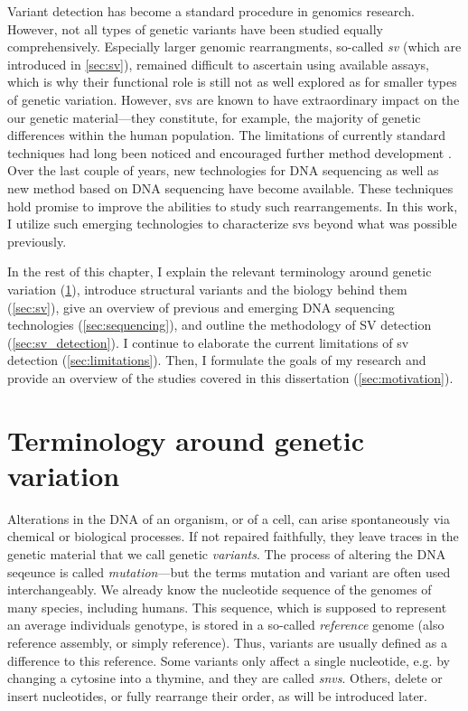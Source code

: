 Variant detection has become a standard procedure in genomics research. However,
not all types of genetic variants have been studied equally comprehensively.
Especially larger genomic rearrangments, so-called \emph{\acl{sv}} (which are
introduced in \cref{sec:sv}), remained
difficult to ascertain using available assays, which is why their functional
role is still not as well explored as for smaller types of genetic variation.
However, \aclp{sv} are known to have extraordinary impact on the our genetic
material---they constitute, for example, the majority of genetic
differences within the human population.
The limitations of currently standard techniques had long been noticed and
encouraged further method development \citep{Onishi-Seebacher2011}. Over the
last couple of years, new technologies for DNA sequencing as well as new method
based on DNA sequencing have become available. These techniques hold promise to
improve the abilities to study such rearrangements. In this work, I utilize such
emerging technologies to characterize \aclp{sv} beyond what was possible previously.

In the rest of this chapter, I explain the relevant terminology around genetic
variation (\cref{sec:variation}), introduce structural variants and the biology
behind them (\cref{sec:sv}), give an overview of previous and emerging DNA
sequencing technologies (\cref{sec:sequencing}), and outline the methodology
of SV detection (\cref{sec:sv_detection}). I continue to elaborate the current
limitations of \acl{sv} detection (\cref{sec:limitations}). Then, I formulate
the goals of my research and provide an overview of the studies covered in this
dissertation (\cref{sec:motivation}).






\section{Terminology around genetic variation}
\label{sec:variation}

Alterations in the DNA of an organism, or of a cell, can arise spontaneously
via chemical or biological processes. If not repaired faithfully, they leave
traces in the genetic material that we call genetic \emph{variants}. The process
of altering the DNA seqeunce is called \emph{mutation}---but the terms mutation
and variant are often used interchangeably.
We already know the nucleotide sequence of the genomes of many species,
including humans. This sequence, which is supposed to represent an average
individuals genotype, is stored in a so-called \emph{reference} genome (also
reference assembly, or simply reference).
Thus, variants are usually defined as a difference to this reference. Some
variants only affect a single nucleotide, e.g. by changing a cytosine into a
thymine, and they are called \emph{\acfp{snv}}. Others, delete or insert
nucleotides, or fully rearrange their order, as will be introduced later.

